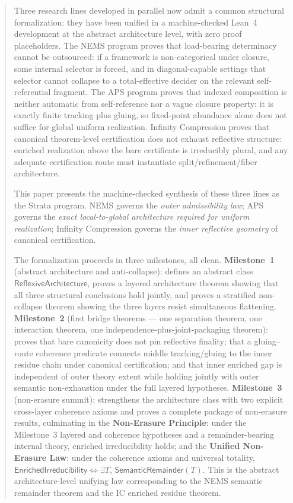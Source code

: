 \documentclass[11pt]{article}
\newcommand{\SemRem}{\ensuremath{\mathsf{SemanticRemainder}}}
\newcommand{\RAL}{\ensuremath{\mathsf{ReflexiveArchitecture}}}
\newcommand{\EnrIrr}{\ensuremath{\mathsf{EnrichedIrreducibility}}}
\begin{document}
\begin{abstract}
Three research lines developed in parallel now admit a common structural formalization:
they have been unified in a machine-checked Lean~4 development at the abstract
architecture level, with zero proof placeholders.  The NEMS program proves that load-bearing determinacy cannot
be outsourced: if a framework is non-categorical under closure, some internal selector is
forced, and in diagonal-capable settings that selector cannot collapse to a total-effective
decider on the relevant self-referential fragment.  The APS program proves that indexed
composition is neither automatic from self-reference nor a vague closure property: it is
exactly finite tracking plus gluing, so fixed-point abundance alone does not suffice for
global uniform realization.  Infinity Compression proves that canonical theorem-level
certification does not exhaust reflective structure: enriched realization above the bare
certificate is irreducibly plural, and any adequate certification route must instantiate
split/refinement/fiber architecture.

This paper presents the machine-checked synthesis of these three lines as the Strata
program.  NEMS governs the \emph{outer admissibility law}; APS governs the \emph{exact
local-to-global architecture required for uniform realization}; Infinity Compression
governs the \emph{inner reflective geometry} of canonical certification.

The formalization proceeds in three milestones, all clean.  \textbf{Milestone~1}
(abstract architecture and anti-collapse): defines an abstract class $\RAL$, proves a
layered architecture theorem showing that all three structural conclusions hold jointly, and
proves a stratified non-collapse theorem showing the three layers resist simultaneous
flattening.  \textbf{Milestone~2} (first bridge theorems --- one separation theorem, one interaction
theorem, one independence-plus-joint-packaging theorem): proves that bare canonicity does not pin reflective
finality; that a gluing--route coherence predicate connects middle tracking/gluing to the
inner residue chain under canonical certification; and that inner enriched gap is
independent of outer theory extent while holding jointly with outer semantic
non-exhaustion under the full layered hypotheses.  \textbf{Milestone~3} (non-erasure
summit): strengthens the architecture class with two explicit cross-layer coherence
axioms and proves a complete package of non-erasure results, culminating in the
\textbf{Non-Erasure Principle}: under the Milestone~3 layered and coherence hypotheses and
a remainder-bearing internal theory, enriched irreducibility holds; and the \textbf{Unified
Non-Erasure Law}: under the coherence axioms and universal totality, $\EnrIrr \iff \exists
T,\,\SemRem(T)$.  This is the abstract architecture-level unifying law corresponding to the NEMS
semantic remainder theorem and the IC enriched residue theorem.


\end{abstract}
\end{document}
